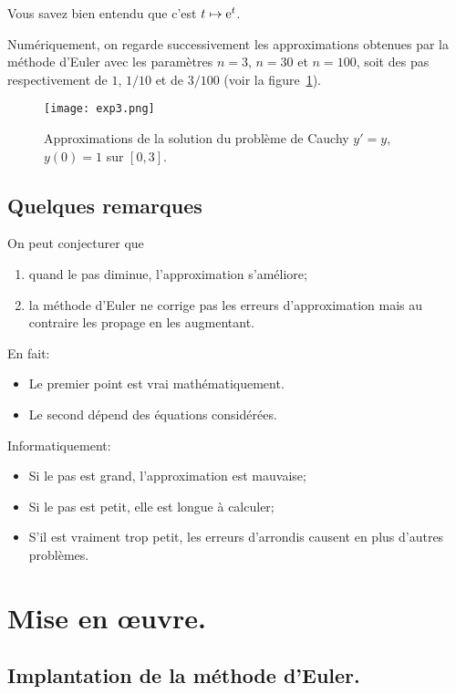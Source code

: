 \begin{rem}
  Vous savez bien entendu que c'est  $t\mapsto \mathrm{e}^{t}$.
\end{rem}

Numériquement, on regarde successivement les approximations obtenues par la méthode d'Euler avec les paramètres $n=3$, $n=30$ et $n=100$, soit des pas respectivement de $1$, $1/10$ et de $3/100$ (voir la figure~\ref{11:fig:exp3}).
\begin{figure}[h!]
\begin{center}
\texttt{[image: exp3.png]}
\caption{Approximations de la solution du problème de Cauchy $y'=y$, $y(0)=1$ sur $[0,3]$.}
\label{11:fig:exp3}
\end{center}
\end{figure}

\subsection{Quelques remarques}
On peut conjecturer que
\begin{enumerate}
\item quand le pas diminue, l'approximation s'améliore;
\item la méthode d'Euler ne corrige pas les erreurs d'approximation
  mais au contraire les propage en les augmentant.
\end{enumerate}

En fait:
\begin{itemize}
\item Le premier point est vrai mathématiquement.
\item Le second dépend des équations considérées.
\end{itemize}

Informatiquement:
\begin{itemize}
\item Si le pas est grand, l'approximation est mauvaise;
\item Si le pas est petit, elle est longue à calculer;
\item S'il est vraiment trop petit, les erreurs d'arrondis causent en
  plus d'autres problèmes.
\end{itemize}

\section{Mise en œuvre.}

\subsection{Implantation de la méthode d'Euler.}

